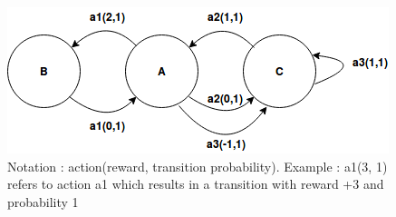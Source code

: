 \documentclass[solution,addpoints,12pt]{exam}
\begin{document}
\begin{questions}
    \begin{figure}[h]
        \centering
        \includegraphics[scale=0.6]{average_reward.png}
        \caption{Notation : action(reward, transition probability). Example : a1(3, 1) refers to action a1 which results in a transition with reward +3 and probability 1}
        \label{fig:avg}
    \end{figure}

\end{questions}
\end{document}
